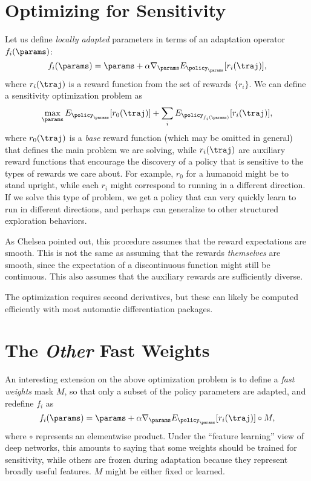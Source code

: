\documentclass{article}
\begin{document}
\section{Optimizing for Sensitivity}

Let us define \emph{locally adapted} parameters in terms of an adaptation operator $f_i(\params)$:
\[
f_i(\params) = \params + \alpha\nabla_\params E_{\policy_\params}[r_i(\traj)],
\]
where $r_i(\traj)$ is a reward function from the set of rewards $\{r_i\}$. We can define a sensitivity optimization problem as
\[
\max_\params E_{\policy_\params}[r_0(\traj)] + \sum_i E_{\policy_{f_i(\params)}}[r_i(\traj)],
\]
where $r_0(\traj)$ is a \emph{base} reward function (which may be omitted in general) that defines the main problem we are solving, while $r_i(\traj)$ are auxiliary reward functions that encourage the discovery of a policy that is sensitive to the types of rewards we care about. For example, $r_0$ for a humanoid might be to stand upright, while each $r_i$ might correspond to running in a different direction. If we solve this type of problem, we get a policy that can very quickly learn to run in different directions, and perhaps can generalize to other structured exploration behaviors.

As Chelsea pointed out, this procedure assumes that the reward expectations are smooth. This is not the same as assuming that the rewards \emph{themselves} are smooth, since the expectation of a discontinuous function might still be continuous. This also assumes that the auxiliary rewards are sufficiently diverse.

The optimization requires second derivatives, but these can likely be computed efficiently with most automatic differentiation packages.

\section{The \emph{Other} Fast Weights}

An interesting extension on the above optimization problem is to define a \emph{fast weights} mask $M$, so that only a subset of the policy parameters are adapted, and redefine $f_i$ as
\[
f_i(\params) = \params + \alpha\nabla_\params E_{\policy_\params}[r_i(\traj)] \circ M,
\]
where $\circ$ represents an elementwise product. Under the ``feature learning'' view of deep networks, this amounts to saying that some weights should be trained for sensitivity, while others are frozen during adaptation because they represent broadly useful features. $M$ might be either fixed or learned.
\end{document}
